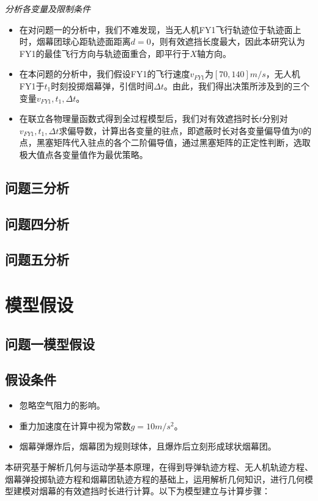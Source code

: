 \documentclass{article}
\begin{document}
\textit{分析各变量及限制条件}
\begin{itemize}
    \item 在对问题一的分析中，我们不难发现，当无人机FY1飞行轨迹位于轨迹面上时，烟幕团球心距轨迹面距离$d=0$，则有效遮挡长度最大，因此本研究认为FY1的最佳飞行方向与轨迹面重合，即平行于$X$轴方向。
    \item 在本问题的分析中，我们假设FY1的飞行速度$v_{FY1}$为$[70,140]m/s$，无人机FY1于$t_1$时刻投掷烟幕弹，引信时间$\Delta t$。由此，我们得出决策所涉及到的三个变量$v_{FY1},t_1,\Delta t$。
    \item 在联立各物理量函数式得到全过程模型后，我们对有效遮挡时长$t$分别对$v_{FY1},t_1,\Delta t$求偏导数，计算出各变量的驻点，即遮蔽时长对各变量偏导值为0的点，黑塞矩阵代入驻点的各个二阶偏导值，通过黑塞矩阵的正定性判断，选取极大值点各变量值作为最优策略。
\end{itemize}
\subsection{问题三分析}

\subsection{问题四分析}

\subsection{问题五分析}

\section{模型假设}

\subsection{问题一模型假设}
\subsection{假设条件}
\begin{itemize}
    \item 忽略空气阻力的影响。
    \item 重力加速度在计算中视为常数$g = 10m/s^2$。
    \item 烟幕弹爆炸后，烟幕团为规则球体，且爆炸后立刻形成球状烟幕团。
\end{itemize}
本研究基于解析几何与运动学基本原理，在得到导弹轨迹方程、无人机轨迹方程、烟幕弹投掷轨迹方程和烟幕团轨迹方程的基础上，运用解析几何知识，进行几何模型建模对烟幕的有效遮挡时长进行计算。以下为模型建立与计算步骤：
\end{document}
